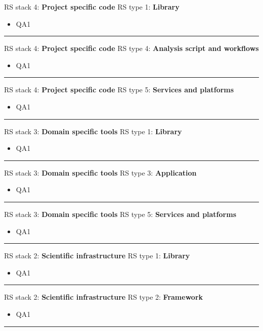 RS stack 4: \textbf{Project specific code} \tab RS type 1: \textbf{Library}

\begin{itemize}
    \item QA1
\end{itemize}
\hrule

RS stack 4: \textbf{Project specific code} \tab RS type 4: \textbf{Analysis script and workflows}

\begin{itemize}
    \item QA1
\end{itemize}
\hrule

RS stack 4: \textbf{Project specific code} \tab RS type 5: \textbf{Services and platforms}

\begin{itemize}
    \item QA1
\end{itemize}
\hrule

RS stack 3: \textbf{Domain specific tools} \tab RS type 1: \textbf{Library}

\begin{itemize}
    \item QA1
\end{itemize}
\hrule

RS stack 3: \textbf{Domain specific tools} \tab RS type 3: \textbf{Application}

\begin{itemize}
    \item QA1
\end{itemize}
\hrule

RS stack 3: \textbf{Domain specific tools} \tab RS type 5: \textbf{Services and platforms}

\begin{itemize}
    \item QA1
\end{itemize}
\hrule

RS stack 2: \textbf{Scientific infrastructure} \tab RS type 1: \textbf{Library}

\begin{itemize}
    \item QA1
\end{itemize}
\hrule

RS stack 2: \textbf{Scientific infrastructure} \tab RS type 2: \textbf{Framework}

\begin{itemize}
    \item QA1
\end{itemize}
\hrule

